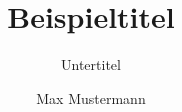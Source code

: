 \documentclass[a4paper,11pt,blue,twoside,bcor=0mm,draft]{tubsreprt}
\title{Beispieltitel}
\subtitle{Untertitel}
\author{Max Mustermann}
\begin{document}
\begin{tubsbox}{1}{1}{6}{1}
  \lipsum[1]
\end{tubsbox}
\begin{tubsbox}{1}{2}{3}{3}
  \lipsum[1]
\end{tubsbox}
\begin{tubsbox}{4}{2}{3}{3}
  \lipsum[1]
\end{tubsbox}
\begin{tubsbox}{1}{5}{2}{4}
  \lipsum[1]
\end{tubsbox}
\begin{tubsbox}{3}{5}{2}{4}
  \lipsum[1]
\end{tubsbox}
\begin{tubsbox}{5}{5}{2}{4}
  \lipsum[1]
\end{tubsbox}

~\clearpage
\makeatletter
 \lipsum[1-2]
\makeatother
\end{document}
